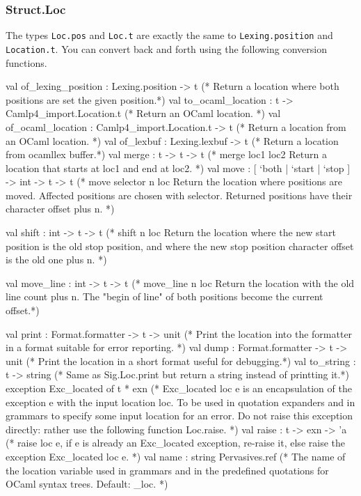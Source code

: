 \begin{ocamlcode}
  
\end{ocamlcode}


\subsubsection{Struct.Loc}
\label{sec:struct.loc}

The types \verb|Loc.pos| and \verb|Loc.t| are exactly the same to
\verb|Lexing.position| and \verb|Location.t|. You can convert back and
forth using the following conversion functions.


\begin{ocamlcode}
  val of_lexing_position : Lexing.position -> t
  (* Return a location where both positions are set the given position.*)
  val to_ocaml_location : t -> Camlp4_import.Location.t
  (* Return an OCaml location. *)
  val of_ocaml_location : Camlp4_import.Location.t -> t
  (* Return a location from an OCaml location. *)
  val of_lexbuf : Lexing.lexbuf -> t
  (* Return a location from ocamllex buffer.*)
  val merge : t -> t -> t
  (* merge loc1 loc2 Return a location that starts at loc1 and end at
  loc2. *)
  val move : [ `both | `start | `stop ] -> int -> t -> t
  (* move selector n loc Return the location where positions are
  moved. Affected positions are chosen with selector. Returned
  positions have their character offset plus n. *)

  val shift : int -> t -> t
  (* shift n loc Return the location where the new start position is
  the old stop position, and where the new stop position character
  offset is the old one plus n. *)

  val move_line : int -> t -> t
  (* move_line n loc Return the location with the old line count plus
  n. The "begin of line" of both positions become the current
  offset.*)

  val print : Format.formatter -> t -> unit
  (* Print the location into the formatter in a format suitable for
  error reporting. *)
  val dump : Format.formatter -> t -> unit
  (* Print the location in a short format useful for debugging.*)
  val to_string : t -> string
  (* Same as Sig.Loc.print but return a string instead of printting it.*)
  exception Exc_located of t * exn
  (* Exc_located loc e is an encapsulation of the exception e with the
  input location loc. To be used in quotation expanders and in
  grammars to specify some input location for an error. Do not raise
  this exception directly: rather use the following function
  Loc.raise. *)
  val raise : t -> exn -> 'a
  (* raise loc e, if e is already an Exc_located exception, re-raise
  it, else raise the exception Exc_located loc e. *)
  val name : string Pervasives.ref
  (* The name of the location variable used in grammars and in the
  predefined quotations for OCaml syntax trees. Default: _loc. *)
\end{ocamlcode}

